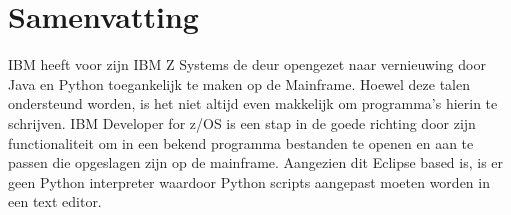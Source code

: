 
%
%
%
%
%

%



\chapter*{Samenvatting}
IBM heeft voor zijn IBM Z Systems de deur opengezet naar vernieuwing door Java en Python toegankelijk te maken op de Mainframe. Hoewel deze talen ondersteund worden, is het niet altijd even makkelijk om programma's hierin te schrijven. IBM Developer for z/OS is een stap in de goede richting door zijn functionaliteit om in een bekend programma bestanden te openen en aan te passen die opgeslagen zijn op de mainframe. Aangezien dit Eclipse based is, is er geen Python interpreter waardoor Python scripts aangepast moeten worden in een text editor. \\

